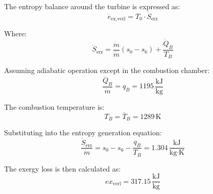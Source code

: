 The entropy balance around the turbine is expressed as:  
\[
\dot{e}_{\text{ex,verl}} = T_0 \cdot \dot{S}_{\text{erz}}
\]  

Where:  
\[
\dot{S}_{\text{erz}} = \frac{\dot{m}}{\dot{m}} \left( s_0 - s_6 \right) + \frac{\dot{Q}_B}{T_B}
\]  

Assuming adiabatic operation except in the combustion chamber:  
\[
\frac{\dot{Q}_B}{\dot{m}} = q_B = 1195 \, \frac{\text{kJ}}{\text{kg}}
\]  

The combustion temperature is:  
\[
T_B = \bar{T}_B = 1289 \, \text{K}
\]  

Substituting into the entropy generation equation:  
\[
\frac{\dot{S}_{\text{erz}}}{\dot{m}} = s_0 - s_6 - \frac{q_B}{T_B} = 1.304 \, \frac{\text{kJ}}{\text{kg·K}}
\]  

The exergy loss is then calculated as:  
\[
ex_{\text{verl}} = 317.15 \, \frac{\text{kJ}}{\text{kg}}
\]